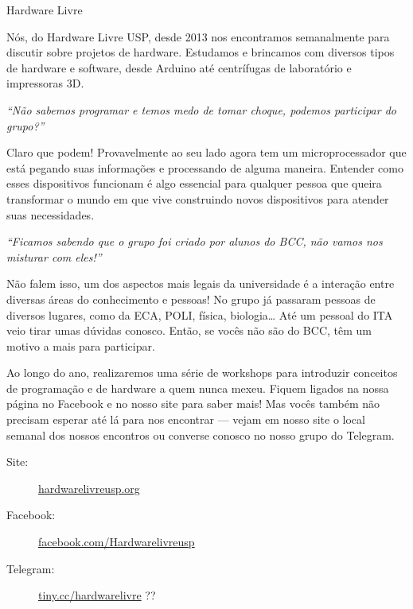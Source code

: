 \begin{subsecao}{Hardware Livre}


Nós, do Hardware Livre USP, desde 2013 nos encontramos semanalmente para
discutir sobre projetos de hardware. Estudamos e brincamos com diversos tipos de
hardware e software, desde Arduino até centrífugas de laboratório e impressoras
3D.

\textit{``Não sabemos programar e temos medo de tomar choque, podemos participar
do grupo?''}

Claro que podem! Provavelmente ao seu lado agora tem um microprocessador que
está pegando suas informações e processando de alguma maneira. Entender como
esses dispositivos funcionam é algo essencial para qualquer pessoa que queira
transformar o mundo em que vive construindo novos dispositivos para atender
suas necessidades.

\textit{``Ficamos sabendo que o grupo foi criado por alunos do BCC, não vamos
nos misturar com eles!''}

Não falem isso, um dos aspectos mais legais da universidade é a interação entre
diversas áreas do conhecimento e pessoas! No grupo já passaram pessoas de
diversos lugares, como da ECA, POLI, física, biologia… Até um pessoal do ITA
veio tirar umas dúvidas conosco. Então, se vocês não são do BCC, têm um motivo a
mais para participar.

Ao longo do ano, realizaremos uma série de workshops para introduzir conceitos 
de programação e de hardware a quem nunca mexeu. Fiquem ligados na nossa página 
no Facebook e no nosso site para saber mais! Mas vocês também não precisam 
esperar até lá para nos encontrar — vejam em nosso site o local semanal dos 
nossos encontros ou converse conosco no nosso grupo do Telegram.

\begin{description}
  \item[Site:] \url{hardwarelivreusp.org}
  \item[Facebook:] \url{facebook.com/Hardwarelivreusp}
  \item[Telegram:] \url{tiny.cc/hardwarelivre} ??
\end{description}

\end{subsecao}
